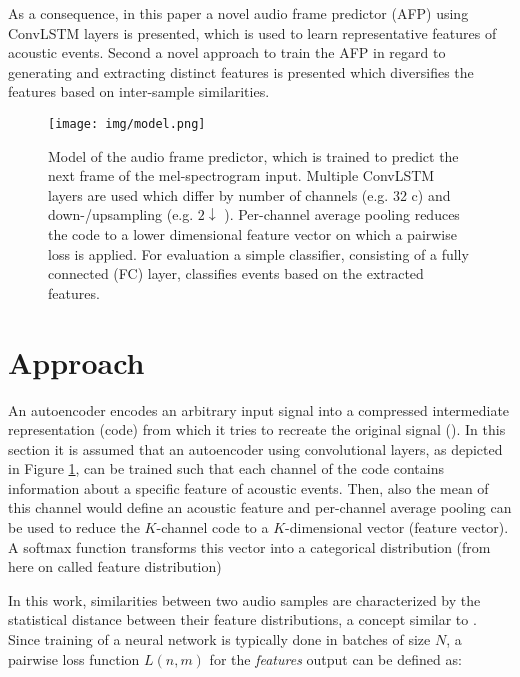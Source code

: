\documentclass{article} %
\begin{document}
As a consequence, in this paper a novel audio frame predictor (AFP) using ConvLSTM layers is presented, which is used to learn representative features of acoustic events. Second a novel approach to train the AFP in regard to generating and extracting distinct features is presented which diversifies the features based on inter-sample similarities.

\begin{figure}[h]
	\begin{center}
		\texttt{[image: img/model.png]}
	\end{center}
	\caption{Model of the audio frame predictor, which is trained to predict the next frame of the mel-spectrogram input. Multiple ConvLSTM layers are used which differ by number of channels (e.g. 32 c) and down-/upsampling (e.g. $2\downarrow$ ). 
	Per-channel average pooling reduces the code to a lower dimensional feature vector on which a pairwise loss is applied. For evaluation a simple classifier, consisting of a fully connected (FC) layer, classifies events based on the extracted features.}
	\label{fig_model}
\end{figure}


\section{Approach}
An autoencoder encodes an arbitrary input signal into a compressed intermediate representation (code) from which it tries to recreate the original signal (\cite{hinton_reducing_2006}).
In this section it is assumed that an autoencoder using convolutional layers, as depicted in Figure \ref{fig_model}, can be trained such that each channel of the code contains information about a specific feature of acoustic events. Then, also the mean of this channel would define an acoustic feature and per-channel average pooling can be used to reduce the $K$-channel code to a $K$-dimensional vector (feature vector). A softmax function transforms this vector into a categorical distribution (from here on called feature distribution)

In this work, similarities between two audio samples are characterized by the statistical distance between their feature distributions, a concept similar to \cite{hsu_neural_2015}. Since training of a neural network is typically done in batches of size $N$, a pairwise loss function $L(n,m)$ for the \emph{features} output can be defined as:

\end{document}
